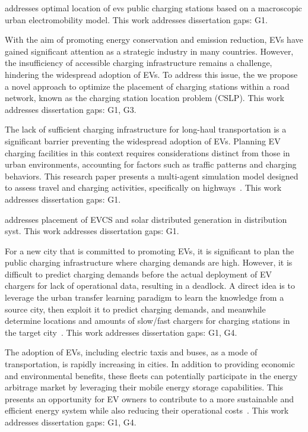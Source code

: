 \documentclass[letterpaper, 12pt, oneside, doublespacing]{Thesis}
\begin{document}
\noindent \cite{optimal_location_2023} addresses optimal location of evs public charging stations based on a macroscopic urban electromobility model. This work addresses dissertation gaps: G1.



\noindent With the aim of promoting energy conservation and emission reduction, EVs have gained significant attention as a strategic industry in many countries. However, the insufficiency of accessible charging infrastructure remains a challenge, hindering the widespread adoption of EVs. To address this issue, the we \cite{optimal_placement_2023} propose a novel approach to optimize the placement of charging stations within a road network, known as the charging station location problem (CSLP). This work addresses dissertation gaps: G1, G3.



\noindent The lack of sufficient charging infrastructure for long-haul transportation is a significant barrier preventing the widespread adoption of EVs. Planning EV charging facilities in this context requires considerations distinct from those in urban environments, accounting for factors such as traffic patterns and charging behaviors. This research paper presents a multi-agent simulation model designed to assess travel and charging activities, specifically on highways~\cite{optimizing_electric_2023}. This work addresses dissertation gaps: G1.



\noindent \cite{placement_of_2023} addresses placement of EVCS and solar distributed generation in distribution syst. This work addresses dissertation gaps: G1.



\noindent For a new city that is committed to promoting EVs, it is significant to plan the public charging infrastructure where charging demands are high. However, it is difficult to predict charging demands before the actual deployment of EV chargers for lack of operational data, resulting in a deadlock. A direct idea is to leverage the urban transfer learning paradigm to learn the knowledge from a source city, then exploit it to predict charging demands, and meanwhile determine locations and amounts of slow/fast chargers for charging stations in the target city~\cite{joint_planning_2023}. This work addresses dissertation gaps: G1, G4.



\noindent The adoption of EVs, including electric taxis and buses, as a mode of transportation, is rapidly increasing in cities. In addition to providing economic and environmental benefits, these fleets can potentially participate in the energy arbitrage market by leveraging their mobile energy storage capabilities. This presents an opportunity for EV owners to contribute to a more sustainable and efficient energy system while also reducing their operational costs~\cite{spatial_arbitrage_2023}. This work addresses dissertation gaps: G1, G4.
\end{document}
